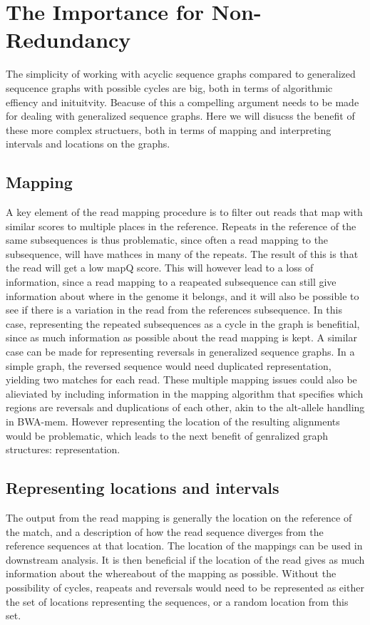   \section{The Importance for Non-Redundancy}
  The simplicity of working with acyclic sequence graphs compared to generalized sequcence graphs with possible cycles are big, both in terms of algorithmic effiency and inituitvity.
  Beacuse of this a compelling argument needs to be made for dealing with generalized sequence graphs.
  Here we will disucss the benefit of these more complex structuers, both in terms of mapping and interpreting intervals and locations on the graphs. 
\subsection{Mapping}
  A key element of the read mapping procedure is to filter out reads that map with similar scores to multiple places in the reference.
  Repeats in the reference of the same subsequences is thus problematic, since often a read mapping to the subsequence, will have mathces in many of the repeats.
  The result of this is that the read will get a low mapQ score.
  This will however lead to a loss of information, since a read mapping to a reapeated subsequence can still give information about where in the genome it belongs, and it will also be possible to see if there is a variation in the read from the references subsequence. 
  In this case, representing the repeated subsequences as a cycle in the graph is benefitial, since as much information as possible about the read mapping is kept.
  A similar case can be made for representing reversals in generalized sequence graphs.
  In a simple graph, the reversed sequence would need duplicated representation, yielding two matches for each read.
  These multiple mapping issues could also be alieviated by including information in the mapping algorithm that specifies which regions are reversals and duplications of each other, akin to the alt-allele handling in BWA-mem.
  However representing the location of the resulting alignments would be problematic, which leads to the next benefit of genralized graph structures: representation.
  \subsection{Representing locations and intervals}
  The output from the read mapping is generally the location on the reference of the match, and a description of how the read sequence diverges from the reference sequences at that location.
  The location of the mappings can be used in downstream analysis.
  It is then beneficial if the location of the read gives as much information about the whereabout of the mapping as possible.
  Without the possibility of cycles, reapeats and reversals would need to be represented as either the set of locations representing the sequences, or a random location from this set.
